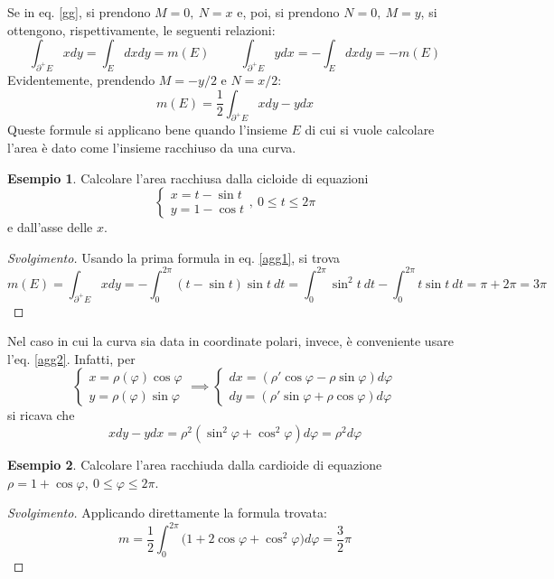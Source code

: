 \documentclass[11pt, a4paper]{scrartcl}
\newenvironment{svolgimento}{\renewcommand\qedsymbol{$\blacksquare$}\begin{proof}[Svolgimento]}{\end{proof}}
\theoremstyle{definition}
\newtheorem{esempio}{Esempio}
\numberwithin{esempio}{section}
\theoremstyle{definition}
\numberwithin{obs}{section}
\numberwithin{nota}{section}
\numberwithin{equation}{subsection}
\begin{document}
Se in eq. \ref{gg}, si prendono $M = 0, \ N = x$ e, poi, si prendono $N= 0 , \ M = y$, si ottengono, rispettivamente, le seguenti relazioni:
\begin{equation}\label{agg1}
	\int_{\partial ^+E } xdy = \int_{E} dxdy = m(E) \hspace{1cm} \int_{\partial ^+ E } ydx = - \int_{E} dxdy  = -  m(E)
\end{equation}
Evidentemente, prendendo $M = - y / 2$ e $N = x / 2$:
\begin{equation}\label{agg2}
	m(E) =  \frac{1}{ 2} \int_{\partial ^+ E } x dy - y dx
\end{equation}
Queste formule si applicano bene quando l'insieme $E$ di cui si vuole calcolare l'area \`e dato come l'insieme racchiuso da una curva.

\begin{esempio}
Calcolare l'area racchiusa dalla cicloide di equazioni
\[
\begin{cases}
	x = t - \sin t \\
	y = 1 - \cos t
\end{cases},  \ 0\le t\le 2 \pi
\] 
e dall'asse delle $x$.
\begin{svolgimento}
	Usando la prima formula in eq. \ref{agg1}, si trova
	\[
	m(E) = \int_{\partial ^+E} xdy =  - \int_{0} ^{2\pi} (t-\sin t ) \sin t \ dt  = \int_{0} ^{2\pi} \sin^2 t \ dt - \int_{0} ^{2\pi} t \sin t \ dt = \pi + 2\pi = 3 \pi 
	\] 
\end{svolgimento}
\end{esempio}
Nel caso in cui la curva sia data in coordinate polari, invece, \`e conveniente usare l'eq. \ref{agg2}.
Infatti, per
\[
\begin{cases}
	x = \rho (\varphi ) \cos  \varphi \\
	y = \rho (\varphi ) \sin \varphi 
\end{cases}\implies \begin{cases}
	dx = (\rho '\cos\varphi  - \rho  \sin \varphi ) d\varphi \\
	dy = (\rho ' \sin  \varphi  + \rho \cos \varphi ) d\varphi 
\end{cases}
\] 
si ricava che
\begin{equation}
xdy - ydx = \rho ^2 (\sin ^2 \varphi  + \cos ^2 \varphi )d\varphi  = \rho ^2 d\varphi 
\end{equation}
\begin{esempio}
Calcolare l'area racchiuda dalla cardioide di equazione $\rho = 1 + \cos \varphi , \ 0\le \varphi \le 2\pi$.
\begin{svolgimento}
	Applicando direttamente la formula trovata:
	\[
	m = \frac{1}{2}\int_{0} ^{2\pi} \big(1 + 2 \cos \varphi  + \cos^2 \varphi  \big) d\varphi = \frac{3}{2}\pi
	\] 
\end{svolgimento}
\end{esempio}
\end{document}
